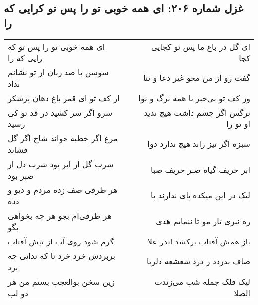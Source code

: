 \begin{center}
\section*{غزل شماره ۲۰۶: ای همه خوبی تو را پس تو کرایی که را}
\label{sec:0206}
\begin{longtable}{l p{0.5cm} r}
ای همه خوبی تو را پس تو که رایی که را
&&
ای گل در باغ ما پس تو کجایی کجا
\\
سوسن با صد زبان از تو نشانم نداد
&&
گفت رو از من مجو غیر دعا و ثنا
\\
از کف تو ای قمر باغ دهان پرشکر
&&
وز کف تو بی‌خبر با همه برگ و نوا
\\
سرو اگر سر کشید در قد تو کی رسید
&&
نرگس اگر چشم داشت هیچ ندید او تو را
\\
مرغ اگر خطبه خواند شاخ اگر گل فشاند
&&
سبزه اگر تیز راند هیچ ندارد دوا
\\
شرب گل از ابر بود شرب دل از صبر بود
&&
ابر حریف گیاه صبر حریف صبا
\\
هر طرفی صف زده مردم و دیو و دده
&&
لیک در این میکده پای ندارند پا
\\
هر طرفی‌ام بجو هر چه بخواهی بگو
&&
ره نبری تار مو تا ننمایم هدی
\\
گرم شود روی آب از تپش آفتاب
&&
باز همش آفتاب برکشد اندر علا
\\
بربردش خرد خرد تا که ندانی چه برد
&&
صاف بدزدد ز درد شعشعه دلربا
\\
زین سخن بوالعجب بستم من هر دو لب
&&
لیک فلک جمله شب می‌زندت الصلا
\\
\end{longtable}
\end{center}
